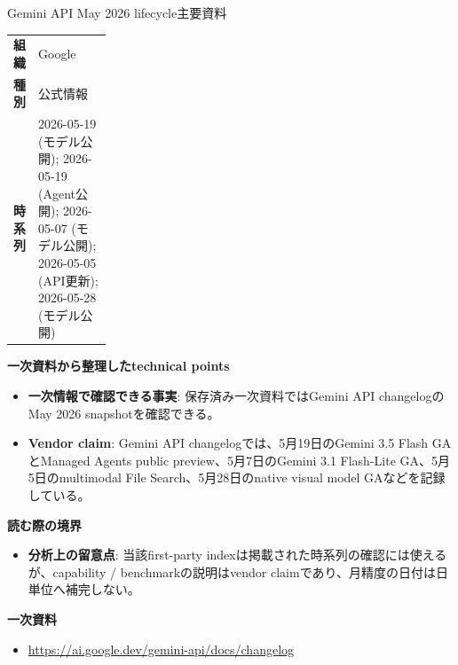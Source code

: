\begin{technicalnote}{Gemini API May 2026 lifecycle}{主要資料}
\begingroup
\begin{tabularx}{\linewidth}{@{}>{\bfseries}p{0.22\linewidth}X@{}}
組織 & Google \\
種別 & 公式情報 \\
時系列 & 2026-05-19 (モデル公開); 2026-05-19 (Agent公開); 2026-05-07 (モデル公開); 2026-05-05 (API更新); 2026-05-28 (モデル公開) \\
\end{tabularx}
\smallskip
{\bfseries 一次資料から整理したtechnical points}
\begin{itemize}[leftmargin=1.5em,itemsep=0.35em]
\item \textbf{一次情報で確認できる事実}: 保存済み一次資料ではGemini API changelogのMay 2026 snapshotを確認できる。
\item \textbf{Vendor claim}: Gemini API changelogでは、5月19日のGemini 3.5 Flash GAとManaged Agents public preview、5月7日のGemini 3.1 Flash-Lite GA、5月5日のmultimodal File Search、5月28日のnative visual model GAなどを記録している。
\end{itemize}
{\bfseries 読む際の境界}
\begin{itemize}[leftmargin=1.5em,itemsep=0.35em]
\item \textbf{分析上の留意点}: 当該first-party indexは掲載された時系列の確認には使えるが、capability / benchmarkの説明はvendor claimであり、月精度の日付は日単位へ補完しない。
\end{itemize}
\begin{samepage}
{\bfseries 一次資料}
\begingroup\sloppy
\begin{itemize}[leftmargin=1.5em,itemsep=0.25em]
\item {\scriptsize\url{https://ai.google.dev/gemini-api/docs/changelog}}
\end{itemize}
\endgroup
\end{samepage}
\endgroup
\end{technicalnote}
\medskip


